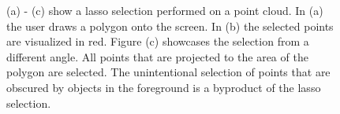 \begin{figure}
    \centering
    \par\medskip
    \par\medskip        
    \caption[Screenshots of the workflow of a lasso selection. (a) shows the lasso, (b) the selected points, (c) shows the selected points from a different angle. ]
    {(a) - (c) show a lasso selection performed on a point cloud. In (a) the user draws a polygon onto the screen. In (b) the selected points are visualized in red. Figure (c) showcases the selection from a different angle. All points that are projected to the area of the polygon are selected. The unintentional selection of points that are obscured by objects in the foreground is a byproduct of the lasso selection. }
    \label{fig:lasso}
\end{figure}


